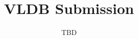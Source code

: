 \documentclass{vldb}
\begin{document}
\title{VLDB Submission}

\author{TBD}

\maketitle











\end{document}
